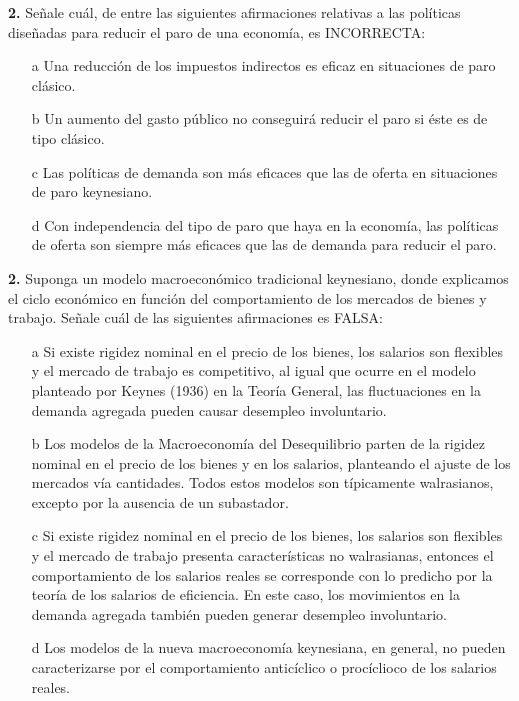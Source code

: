 \documentclass{nuevotema}
\begin{document}
\textbf{2.} Señale cuál, de entre las siguientes afirmaciones relativas a las políticas diseñadas para reducir el paro de una economía, es INCORRECTA:
\begin{itemize}
	\item[a] Una reducción de los impuestos indirectos es eficaz en situaciones de paro clásico.
	\item[b] Un aumento del gasto público no conseguirá reducir el paro si éste es de tipo clásico.
	\item[c] Las políticas de demanda son más eficaces que las de oferta en situaciones de paro keynesiano.
	\item[d] Con independencia del tipo de paro que haya en la economía, las políticas de oferta son siempre más eficaces que las de demanda para reducir el paro.
\end{itemize}

\textbf{2.} Suponga un modelo macroeconómico tradicional keynesiano, donde explicamos el ciclo económico en función del comportamiento de los mercados de bienes y trabajo. Señale cuál de las siguientes afirmaciones es FALSA:
\begin{itemize}
	\item[a] Si existe rigidez nominal en el precio de los bienes, los salarios son flexibles y el mercado de trabajo es competitivo, al igual que ocurre en el modelo planteado por Keynes (1936) en la Teoría General, las fluctuaciones en la demanda agregada pueden causar desempleo involuntario.
	\item[b] Los modelos de la Macroeconomía del Desequilibrio parten de la rigidez nominal en el precio de los bienes y en los salarios, planteando el ajuste de los mercados vía cantidades. Todos estos modelos son típicamente walrasianos, excepto por la ausencia de un subastador.
	\item[c] Si existe rigidez nominal en el precio de los bienes, los salarios son flexibles y el mercado de trabajo presenta características no walrasianas, entonces el comportamiento de los salarios reales se corresponde con lo predicho por la teoría de los salarios de eficiencia. En este caso, los movimientos en la demanda agregada también pueden generar desempleo involuntario.
	\item[d] Los modelos de la nueva macroeconomía keynesiana, en general, no pueden caracterizarse por el comportamiento anticíclico o procíclioco de los salarios reales.
\end{itemize}

\notas
\end{document}
